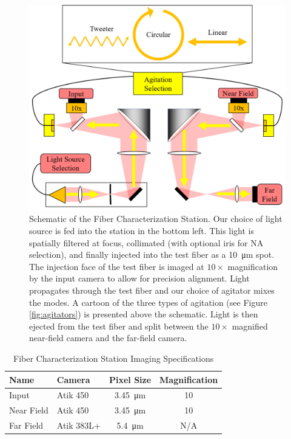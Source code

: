 \begin{figure}
\centering
	\includegraphics[width=\columnwidth]{figures-2/fcs_schematic.pdf}
	\caption[Schematic of the Fiber Characterization Station]{Schematic of the Fiber Characterization Station. Our choice of light source is fed into the station in the bottom left. This light is spatially filtered at focus, collimated (with optional iris for NA selection), and finally injected into the test fiber as a \SI{10}{\micro\meter} spot. The injection face of the test fiber is imaged at $10\times$ magnification by the input camera to allow for precision alignment. Light propagates through the test fiber and our choice of agitator mixes the modes. A cartoon of the three types of agitation (see Figure \ref{fig:agitators}) is presented above the schematic. Light is then ejected from the test fiber and split between the $10\times$ magnified near-field camera and the far-field camera.}
\label{fig:fcs}
\end{figure}

\begin{table}
\centering
\caption{Fiber Characterization Station Imaging Specifications}
	\begin{tabular}{llcc}
	\hline
	Name & Camera & Pixel Size & Magnification \\
	\hline \hline
	Input & Atik 450 & \SI{3.45}{\micro\meter} & 10 \\
	\hline
	Near Field & Atik 450 & \SI{3.45}{\micro\meter} & 10 \\
	\hline
	Far Field & Atik 383L+ & \SI{5.4}{\micro\meter} & N/A \\
	\hline	
	\end{tabular}
\label{table:cameras}
\end{table}

